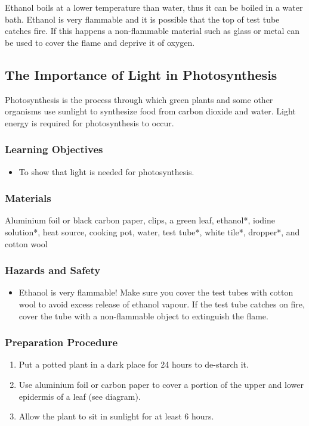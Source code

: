 Ethanol boils at a lower temperature than water, thus it can be boiled in a water bath. Ethanol is very flammable and it is possible that the top of test tube catches fire. If this happens a non-flammable material such as glass or metal can be used to cover the flame and deprive it of oxygen.

\subsection{The Importance of Light in Photosynthesis}
Photosynthesis is the process through which green plants and some other organisms use sunlight to synthesize food from carbon dioxide and water. Light energy is required for photosynthesis to occur.

\subsubsection*{Learning Objectives}
\begin{itemize}
\item{To show that light is needed for photosynthesis.}
\end{itemize}

\subsubsection*{Materials}
Aluminium foil or black carbon paper, clips, a green leaf, ethanol*, iodine solution*, heat source, cooking pot, water, test tube*, white tile*, dropper*, and cotton wool

\subsubsection*{Hazards and Safety}
\begin{itemize}
\item{Ethanol is very flammable! Make sure you cover the test tubes with cotton wool to avoid excess release of ethanol vapour. If the test tube catches on fire, cover the tube with a non-flammable object to extinguish the flame.}
\end{itemize}

\subsubsection*{Preparation Procedure}
\begin{enumerate}
\item{Put a potted plant in a dark place for 24 hours to de-starch it.}
\item{Use aluminium foil or carbon paper to cover a portion of the upper and lower epidermis of a leaf (see diagram).}
\item{Allow the plant to sit in sunlight for at least 6 hours.}
\end{enumerate}

